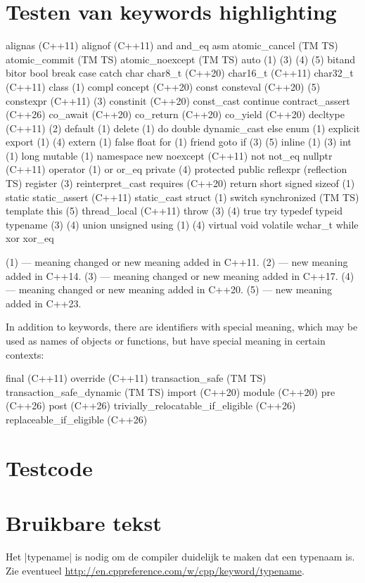 \begin{cpplstShortInline}
\section{Testen van keywords highlighting}
\begin{cpplstfragment}
alignas (C++11)
alignof (C++11)
and
and_eq
asm
atomic_cancel (TM TS)
atomic_commit (TM TS)
atomic_noexcept (TM TS)
auto (1) (3) (4) (5)
bitand
bitor
bool
break
case
catch
char
char8_t (C++20)
char16_t (C++11)
char32_t (C++11)
class (1)
compl
concept (C++20)
const
consteval (C++20) (5)
constexpr (C++11) (3)
constinit (C++20)
const_cast
continue
contract_assert (C++26)
co_await (C++20)
co_return (C++20)
co_yield (C++20)
decltype (C++11) (2)
default (1)
delete (1)
do
double
dynamic_cast
else
enum (1)
explicit
export (1) (4)
extern (1)
false
float
for (1)
friend
goto
if (3) (5)
inline (1) (3)
int (1)
long
mutable (1)
namespace
new
noexcept (C++11)
not
not_eq
nullptr (C++11)
operator (1)
or
or_eq
private (4)
protected
public
reflexpr (reflection TS)
register (3)
reinterpret_cast
requires (C++20)
return
short
signed
sizeof (1)
static
static_assert (C++11)
static_cast
struct (1)
switch
synchronized (TM TS)
template
this (5)
thread_local (C++11)
throw (3) (4)
true
try
typedef
typeid
typename (3) (4)
union
unsigned
using (1) (4)
virtual
void
volatile
wchar_t
while
xor
xor_eq 
\end{cpplstfragment}

(1) — meaning changed or new meaning added in C++11.
(2) — new meaning added in C++14.
(3) — meaning changed or new meaning added in C++17.
(4) — meaning changed or new meaning added in C++20.
(5) — new meaning added in C++23. 

In addition to keywords, there are identifiers with special meaning, which may be used as names of objects or functions, but have special meaning in certain contexts:

\begin{cpplstfragment}
final (C++11)
override (C++11)
transaction_safe (TM TS)
transaction_safe_dynamic (TM TS)
import (C++20)
module (C++20)
pre (C++26)
post (C++26)
trivially_relocatable_if_eligible (C++26)
replaceable_if_eligible (C++26)
\end{cpplstfragment}

\section{Testcode}


\section{Bruikbare tekst}
Het  |typename| is nodig om de compiler duidelijk te maken dat  een typenaam is.
Zie eventueel \url{http://en.cppreference.com/w/cpp/keyword/typename}.


\end{cpplstShortInline}
